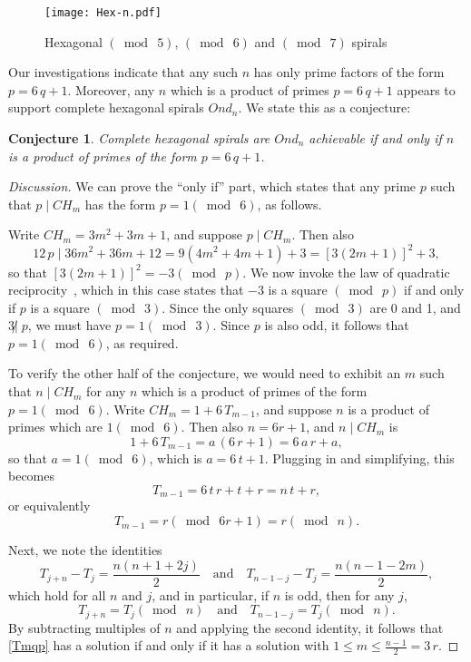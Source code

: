 \documentclass{article}
\newtheorem{conj}{Conjecture}
\theoremstyle{definition}
\def\pmod#1{(\bmod\  #1)}
\def\com#1{\quad\text{{#1}}\quad}
\def\ndiv{{\not|\;}}
\begin{document}
\begin{figure}[htb]
  \centering
  \texttt{[image: Hex-n.pdf]}
  \caption{Hexagonal $\pmod5$, $\pmod6$ and $\pmod 7$ spirals}
  \label{fig:hexN}
\end{figure}

Our investigations indicate that any such $n$ has only prime factors
of the form $p=6\,q+1$.  Moreover, any $n$ which is a product of
primes $p=6\,q+1$ appears to support complete hexagonal spirals
$Ond_n$.  We state this as a conjecture:

\begin{conj}
  Complete hexagonal spirals are $Ond_n$ achievable if and only if $n$
  is a product of primes of the form $p=6\,q+1$.
\end{conj}

\begin{proof}[Discussion]
We can prove the ``only if'' part, which states that any prime $p$
such that $p\mid CH_m$ has the form $p=1\pmod6$, as follows.

Write $CH_m = 3m^2+3m+1$, and suppose $p\mid CH_m$.  Then also
\[
  12\,p\mid 36m^2+36m+12 = 9(4m^2+4m+1)+3 = [3(2m+1)]^2+3,
\]
so that $[3(2m+1)]^2 = -3 \pmod p$.  We now invoke the law of
quadratic reciprocity~\cite{}, which in this case states that $-3$ is
a square $\pmod p$ if and only if $p$ is a square $\pmod 3$.  Since
the only squares $\pmod 3$ are 0 and 1, and $3\ndiv p$, we must have
$p=1\pmod 3$.  Since $p$ is also odd, it follows that $p=1\pmod 6$, as
required.

To verify the other half of the conjecture, we would need to exhibit
an $m$ such that $n\mid CH_m$ for any $n$ which is a product of primes
of the form $p=1\pmod 6$.  Write $CH_m = 1 + 6\,T_{m-1}$, and suppose
$n$ is a product of primes which are $1\pmod6$.  Then also $n=6r+1$,
and $n\mid CH_m$ is
\[
  1 + 6\,T_{m-1} = a\,(6\,r+1) = 6\,a\,r + a,
\]
so that $a = 1\pmod 6$, which is $a=6\,t+1$.  Plugging in and
simplifying, this becomes
\[
  T_{m-1} = 6\,t\,r + t + r = n\,t + r,
\]
or equivalently
\begin{equation}
  T_{m-1} = r \pmod {6r+1} = r \pmod n.
  \label{Tmqp}
\end{equation}

Next, we note the identities
\[
  T_{j+n} - T_j = \frac{n(n+1+2j)}2  \com{and}
  T_{n-1-j} - T_j = \frac{n(n-1-2m)}2,
\]
which hold for all $n$ and $j$, and in particular, if $n$ is odd, then
for any $j$,
\[
  T_{j+n} = T_j\pmod n \com{and}  T_{n-1-j} = T_j\pmod n.
\]
By subtracting multiples of $n$ and applying the second identity, it
follows that \eqref{Tmqp} has a solution if and only if it has a 
solution with $1\le m\le \frac{n-1}2 = 3\,r$.
\end{proof}
\end{document}
